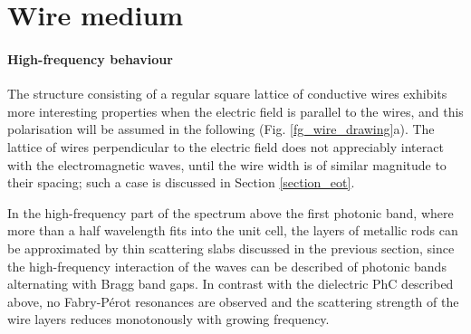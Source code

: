
\FloatBarrier %
\section{Wire medium} \label{chap_wiremedium}%
\paragraph{High-frequency behaviour}%
The structure consisting of a regular square lattice of conductive wires exhibits more interesting properties when the electric field is parallel to the wires, and this polarisation will be assumed in the following (Fig. \ref{fg_wire_drawing}a). The lattice of wires perpendicular to the electric field does not appreciably interact with the electromagnetic waves, until the wire width is of similar magnitude to their spacing; such a case is discussed in Section \ref{section_eot}.

In the high-frequency part of the spectrum above the first photonic band, where more than a half wavelength fits into the unit cell, the layers of metallic rods can be approximated by thin scattering slabs discussed in the previous section, since the high-frequency interaction of the waves can be described of photonic bands alternating with Bragg band gaps. In contrast with the dielectric PhC described above, no Fabry-Pérot resonances are observed and the scattering strength of the wire layers reduces monotonously with growing frequency.

